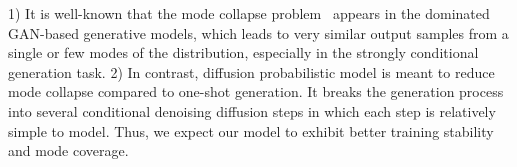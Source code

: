 1) It is well-known that the mode collapse problem~\cite{creswell2018generative} appears in the dominated GAN-based generative models, which leads to very similar output samples from a single or few modes of the distribution, especially in the strongly conditional generation task.  
2) In contrast, diffusion probabilistic model is meant to reduce mode collapse compared to one-shot generation. It breaks the generation process into several conditional denoising diffusion steps in which each step is relatively simple to model. Thus, we expect our model to exhibit better training stability and mode coverage. 
